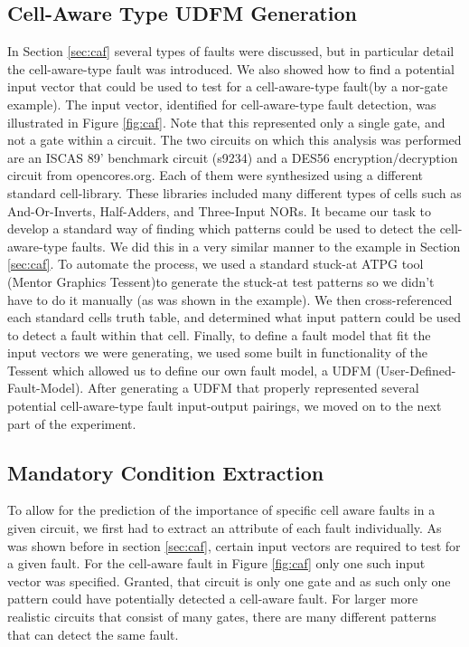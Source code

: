     \subsection{Cell-Aware Type UDFM Generation}
    In Section \ref{sec:caf} several types of faults were discussed, but in particular detail the cell-aware-type fault was introduced. 
    We also showed how to find a potential input vector that could be used to test for a cell-aware-type fault(by a nor-gate example). 
    The input vector, identified for cell-aware-type fault detection, was illustrated in Figure \ref{fig:caf}.
    Note that this represented only a single gate, and not a gate within a circuit. 
    The two circuits on which this analysis was performed are an ISCAS 89' benchmark circuit (s9234) and a DES56 encryption/decryption circuit from opencores.org.
    Each of them were synthesized using a different standard cell-library.
    These libraries included many different types of cells such as And-Or-Inverts, Half-Adders, and Three-Input NORs. 
    It became our task to develop a standard way of finding which patterns could be used to detect the cell-aware-type faults. 
    We did this in a very similar manner to the example in Section \ref{sec:caf}. 
    To automate the process, we used a standard stuck-at ATPG tool (Mentor Graphics Tessent)to generate the stuck-at test patterns so we didn't have to do it manually (as was shown in the example).
    We then cross-referenced each standard cells truth table, and determined what input pattern could be used to detect a fault within that cell. 
    Finally, to define a fault model that fit the input vectors we were generating, we used some built in functionality of the Tessent which allowed us to define our own fault model, a UDFM (User-Defined-Fault-Model).
    After generating a UDFM that properly represented several potential cell-aware-type fault input-output pairings,  we moved on to the next part of the experiment.

    \subsection{Mandatory Condition Extraction}
    To allow for the prediction of the importance of specific cell aware faults in a given circuit, we first had to extract an attribute of each fault individually. 
    As was shown before in section \ref{sec:caf}, certain input vectors are required to test for a given fault. 
    For the cell-aware fault in Figure \ref{fig:caf} only one such input vector was specified. 
    Granted, that circuit is only one gate and as such only one pattern could have potentially detected a cell-aware fault. 
    For larger more realistic circuits that consist of many gates, there are many different patterns that can detect the same fault.

